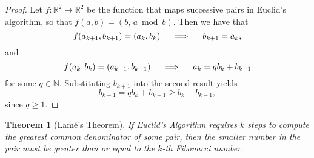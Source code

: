 \documentclass{article}
\newtheorem{theorem}{Theorem}
\begin{document}
\begin{proof}
  Let $f: \mathbb{R}^2 \mapsto \mathbb{R}^2$ be the function that maps
  successive pairs in Euclid's algorithm, so that $f(a, b) = (b,\, a \bmod b)$.
  Then we have that
  \begin{equation*}
    f(a_{k + 1}, b_{k + 1}) = (a_k, b_k) \hspace{5mm} \Longrightarrow \hspace{5mm} b_{k + 1} = a_k,
  \end{equation*}
  and
  \begin{equation*}
    f(a_{k}, b_{k}) = (a_{k - 1}, b_{k - 1}) \hspace{5mm} \Longrightarrow \hspace{5mm} a_{k} = qb_{k} + b_{k - 1}
  \end{equation*}
  for some $q \in \mathbb{N}$.  Substituting $b_{k + 1}$ into the second result yields
  \begin{equation*}
    b_{k + 1} = qb_{k} + b_{k - 1} \geq b_{k} + b_{k - 1},
  \end{equation*}
  since $q \geq 1$.
\end{proof}
\vspace{5mm}




\begin{theorem}[Lam\'e's Theorem]
  If Euclid's Algorithm requires $k$ steps to compute the greatest common
  denominator of some pair, then the smaller number in the pair must be greater
  than or equal to the $k$-th Fibonacci number.
\end{theorem}
\end{document}
